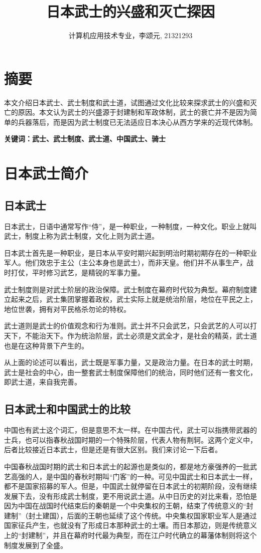 \documentclass[utf8,a4paper]{ctexart}
\title{日本武士的兴盛和灭亡探因}
\author{计算机应用技术专业，李颂元, 21321293}
\begin{document}
\maketitle
\section*{摘要}
本文介绍日本武士、武士制度和武士道，试图通过文化比较来探求武士的兴盛和灭亡的原因。本文认为武士的兴盛源于封建制和军政体制，武士的衰亡并不是因为简单的兵器落后，而是因为武士制度已无法适应日本决心从西方学来的近现代体制。

\textbf{关键词：武士、武士制度、武士道、中国武士、骑士}
\tableofcontents
\section{日本武士简介}
\subsection{日本武士}
日本武士，日语中通常写作“侍”，是一种职业，一种制度，一种文化。职业上就叫武士，制度上称为武士制度，文化上则为武士道。

日本武士首先是一种职业，是日本从平安时期兴起到明治时期初期存在的一种职业军人。他们效忠于主公（主公本身也是武士），而非天皇。他们并不从事生产，战时打仗，平时修习武艺，是精锐的军事力量\cite{zhe03}。

武士制度则是对武士阶层的政治保障。武士制度在幕府时代较为典型。幕府制度建立起来之后，武士集团掌握着政权，武士实际上就是统治阶层，地位在平民之上，地位世袭，拥有对平民格杀勿论的特权\cite{zhe03}。

武士道则是武士的价值观念和行为准则。武士并不只会武艺，只会武艺的人可以打天下，不能治天下。作为统治阶层，武士必须是文武全才，是社会的精英，武士道也是在这种背景下产生的。

从上面的论述可以看出，武士既是军事力量，又是政治力量。在日本的武士时期，武士是社会的中心，由一整套武士制度保障他们的统治，同时他们还有一套文化，即武士道，来自我完善。
\subsection{日本武士和中国武士的比较}
中国也有武士这个词汇，但是意思不太一样。在中国古代，武士可以指携带武器的士兵，也可以指春秋战国时期的一个特殊阶层，代表人物有荆轲。这两个定义中，后者比较接近日本武士，但是还是有很大区别。我们来讨论一下后者。

中国春秋战国时期的武士和日本武士的起源也是类似的，都是地方豪强养的一批武艺高强的人，是中国的春秋时期叫“门客”的一种。可见中国武士和日本武士一样，都不是国家招募的军人。但是，中国武士就停留在日本武士的初期阶段，没有继续发展下去，没有形成武士制度，更不用说武士道。从中日历史的对比来看，恐怕是因为中国在战国时代结束后的秦朝是一个中央集权的王朝，结束了传统意义的“封建制”（封土建国），后面的王朝也延续了这个传统。中央集权国家职业军人是通过国家征兵产生，也就没有了形成日本那种武士的土壤。而日本那边，则是传统意义上的“封建制”，并且在幕府时代最为典型，而在江户时代确立的幕藩体制则将这个制度发展到了全盛\cite{shi91}。
\end{document}
